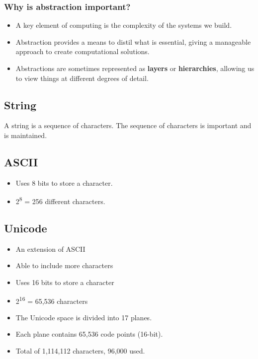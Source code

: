 \documentclass[11pt]{article}
\begin{document}
\subsubsection{Why is abstraction important?}
\label{sec:orgf47dd5d}
\begin{itemize}
\item A key element of computing is the complexity of the systems we build.
\item Abstraction provides a means to distil what is essential, giving a manageable approach to create computational solutions.
\item Abstractions are sometimes represented as \textbf{layers} or \textbf{hierarchies}, allowing us to view things at different degrees of detail.
\end{itemize}

\subsection{String}
\label{sec:org07dec73}
A string is a sequence of characters. The sequence of characters is important and is maintained.

\subsection{ASCII}
\label{sec:org1112a02}
\begin{itemize}
\item Uses 8 bits to store a character.
\item 2\textsuperscript{8} = 256 different characters.
\end{itemize}

\subsection{Unicode}
\label{sec:orge2376f9}
\begin{itemize}
\item An extension of ASCII
\item Able to include more characters
\item Uses 16 bits to store a character
\item 2\textsuperscript{16} = 65,536 characters
\item The Unicode space is divided into 17 planes.
\item Each plane contains 65,536 code points (16-bit).
\item Total of 1,114,112 characters, 96,000 used.
\end{itemize}
\end{document}
